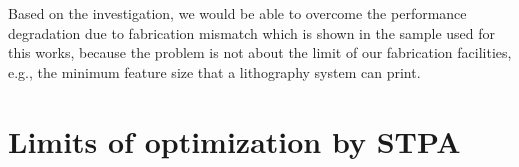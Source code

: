 Based on the investigation, we would be able to overcome the performance degradation due to fabrication mismatch which is shown in the sample used for this works, because the problem is not about the limit of our fabrication facilities, e.g., the minimum feature size that a lithography system can print.

\section{Limits of optimization by STPA}

